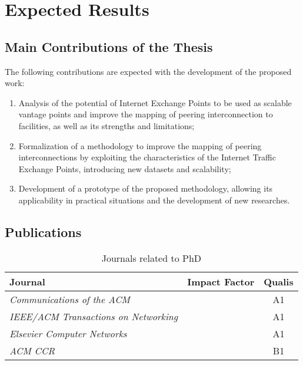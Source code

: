 \chapter{Expected Results}\label{cap:expected-results}
\thispagestyle{empty}

	\section{Main Contributions of the Thesis}\label{cap:contributions}
	\thispagestyle{empty}

	The following contributions are expected with the development of the proposed work:

	\begin{enumerate}
    \item Analysis of the potential of Internet Exchange Points to be used as scalable vantage points and improve the mapping of peering interconnection to facilities, as well as its strengths and limitations;

    \item Formalization of a methodology to improve the mapping of peering interconnections by exploiting the characteristics of the Internet Traffic Exchange Points, introducing new datasets and scalability;

    \item Development of a prototype of the proposed methodology, allowing its applicability in practical situations and the development of new researches.
    \end{enumerate}


	\section{Publications}
	\label{sec:publications}

	\begin{table}[htp]
	\centering
	\begin{tabularx}{\textwidth}{l | c | c}
	\hline \hline
	{\bf Journal}                                           & {\bf Impact Factor} & \textbf{Qualis} \\ \hline
    \textit{Communications of the ACM}                        &                   & A1 \\ \hline
	\textit{IEEE/ACM Transactions on Networking}              &                   & A1 \\ \hline
	\textit{Elsevier Computer Networks}                       &                   & A1 \\ \hline
	\textit{ACM CCR}                					      &                   & B1 \\ \hline
	

	\hline
	\end{tabularx}
	\caption{Journals related to PhD}
	\label{tbl:journals}
	\end{table}

